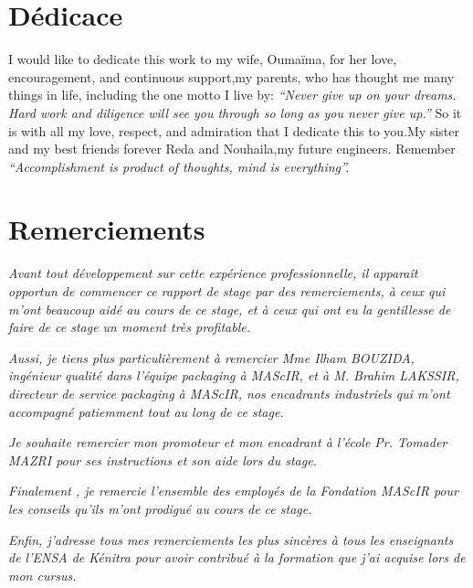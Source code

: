 \documentclass[11pt, a4paper, twoside]{book}
\author{Réalisé par : \\ Otmane BOUAYAD \vspace*{1truecm} \\ Encadré par : \\
Mme Ilham BOUZIDA : Encadrante professionnelle\\ 
Pr Tomader MAZRI : Encadrante académique\\
}
\date{(Du 15 Février au 30 Juin  2016)}
\begin{document}
\maketitle
\pagestyle{plain}
\frenchspacing
\chapter*{Dédicace}

I would like to dedicate this work to my wife, Oumaïma, for her love, encouragement, and continuous support,my parents, who has thought me many things in life, including the one motto I live by: 
\emph{“Never give up on your dreams. Hard work and diligence will see you through so long as you never give up.”}
 So it is with all my love, respect, and admiration that I dedicate this to you.My sister and my best friends forever Reda and Nouhaila,my future engineers. Remember
\emph{“Accomplishment is product of thoughts, mind is everything”.}

\chapter*{Remerciements}
\emph{
Avant tout développement sur cette expérience professionnelle, il apparaît opportun 
de commencer ce rapport de stage par des remerciements, à ceux qui  m'ont beaucoup 
aidé au cours de ce stage, et à ceux qui ont eu la gentillesse de faire de ce stage un 
moment très profitable.\\}

\emph{
Aussi, je tiens plus particulièrement à remercier Mme Ilham
BOUZIDA, ingénieur qualité dans l’équipe packaging à MAScIR, et à M. Brahim LAKSSIR, directeur de service packaging à MAScIR, nos encadrants industriels qui  m'ont accompagné patiemment tout au long de ce stage.\\}

\emph{Je souhaite remercier mon promoteur et mon encadrant à l'école Pr. Tomader MAZRI pour ses instructions et son aide lors du stage.\\}



\emph{Finalement , je remercie l'ensemble des employés de la Fondation MAScIR pour les conseils qu’ils m'ont prodigué au cours de ce stage.\\ }

\emph{Enfin, j’adresse tous mes remerciements les plus sincères à tous les enseignants de l’ENSA de Kénitra pour avoir contribué à la formation que j’ai acquise lors de mon cursus.}
\tableofcontents
\end{document}
